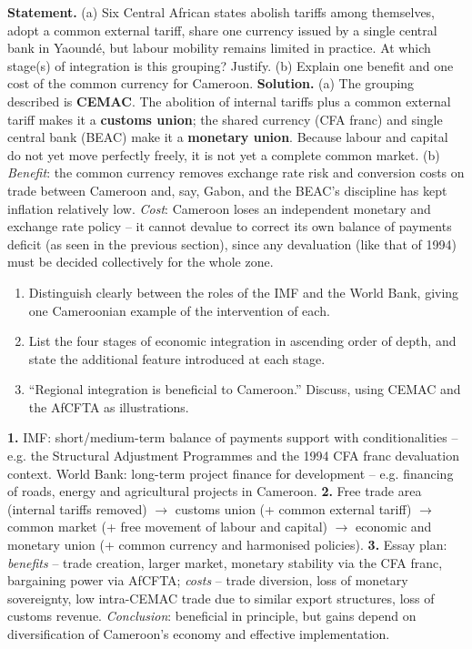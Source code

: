 \documentclass[11pt]{article}
\begin{document}
\begin{exoresolu}
\textbf{Statement.} (a) Six Central African states abolish tariffs among themselves, adopt a common external tariff, share one currency issued by a single central bank in Yaound\'e, but labour mobility remains limited in practice. At which stage(s) of integration is this grouping? Justify. (b) Explain one benefit and one cost of the common currency for Cameroon.
\tcblower
\textbf{Solution.} (a) The grouping described is \textbf{CEMAC}. The abolition of internal tariffs plus a common external tariff makes it a \textbf{customs union}; the shared currency (CFA franc) and single central bank (BEAC) make it a \textbf{monetary union}. Because labour and capital do not yet move perfectly freely, it is not yet a complete common market. (b) \emph{Benefit}: the common currency removes exchange rate risk and conversion costs on trade between Cameroon and, say, Gabon, and the BEAC's discipline has kept inflation relatively low. \emph{Cost}: Cameroon loses an independent monetary and exchange rate policy -- it cannot devalue to correct its own balance of payments deficit (as seen in the previous section), since any devaluation (like that of 1994) must be decided collectively for the whole zone.
\end{exoresolu}

\begin{exercice}[Practice]
\begin{enumerate}
\item Distinguish clearly between the roles of the IMF and the World Bank, giving one Cameroonian example of the intervention of each.
\item List the four stages of economic integration in ascending order of depth, and state the additional feature introduced at each stage.
\item ``Regional integration is beneficial to Cameroon.'' Discuss, using CEMAC and the AfCFTA as illustrations.
\end{enumerate}
\end{exercice}

\begin{corrige}[Exercise 1]
\textbf{1.} IMF: short/medium-term balance of payments support with conditionalities -- e.g. the Structural Adjustment Programmes and the 1994 CFA franc devaluation context. World Bank: long-term project finance for development -- e.g. financing of roads, energy and agricultural projects in Cameroon. \textbf{2.} Free trade area (internal tariffs removed) $\rightarrow$ customs union (+ common external tariff) $\rightarrow$ common market (+ free movement of labour and capital) $\rightarrow$ economic and monetary union (+ common currency and harmonised policies). \textbf{3.} Essay plan: \emph{benefits} -- trade creation, larger market, monetary stability via the CFA franc, bargaining power via AfCFTA; \emph{costs} -- trade diversion, loss of monetary sovereignty, low intra-CEMAC trade due to similar export structures, loss of customs revenue. \emph{Conclusion}: beneficial in principle, but gains depend on diversification of Cameroon's economy and effective implementation.
\end{corrige}
\end{document}
